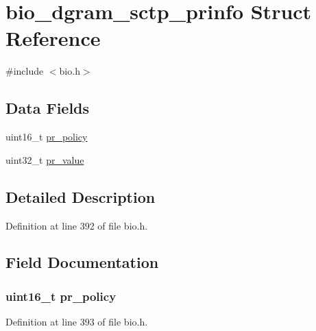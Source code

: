 \hypertarget{structbio__dgram__sctp__prinfo}{}\section{bio\+\_\+dgram\+\_\+sctp\+\_\+prinfo Struct Reference}
\label{structbio__dgram__sctp__prinfo}


{\ttfamily \#include $<$bio.\+h$>$}

\subsection*{Data Fields}
\begin{DoxyCompactItemize}
\item 
uint16\+\_\+t \hyperlink{structbio__dgram__sctp__prinfo_a2d6b61a53ff6b603bca39252da5591c4}{pr\+\_\+policy}
\item 
uint32\+\_\+t \hyperlink{structbio__dgram__sctp__prinfo_ab2d793ab7f915461b1d30205c316d8b1}{pr\+\_\+value}
\end{DoxyCompactItemize}


\subsection{Detailed Description}


Definition at line 392 of file bio.\+h.



\subsection{Field Documentation}
\subsubsection[{\texorpdfstring{pr\+\_\+policy}{pr_policy}}]{\setlength{\rightskip}{0pt plus 5cm}uint16\+\_\+t pr\+\_\+policy}\hypertarget{structbio__dgram__sctp__prinfo_a2d6b61a53ff6b603bca39252da5591c4}{}\label{structbio__dgram__sctp__prinfo_a2d6b61a53ff6b603bca39252da5591c4}


Definition at line 393 of file bio.\+h.


